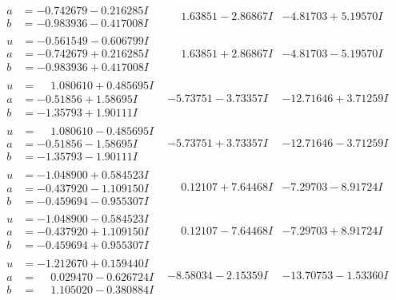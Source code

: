 \documentclass[1p]{elsarticle_modified}
\theoremstyle{definition}
\begin{document}
$$\begin{array}{c|c|c}
\begin{aligned}
a &= -0.742679 - 0.216285 I \\
b &= -0.983936 - 0.417008 I\end{aligned}
 & \phantom{-}1.63851 - 2.86867 I & -4.81703 + 5.19570 I \\ \hline\begin{aligned}
u &= -0.561549 - 0.606799 I \\
a &= -0.742679 + 0.216285 I \\
b &= -0.983936 + 0.417008 I\end{aligned}
 & \phantom{-}1.63851 + 2.86867 I & -4.81703 - 5.19570 I \\ \hline\begin{aligned}
u &= \phantom{-}1.080610 + 0.485695 I \\
a &= -0.51856 + 1.58695 I \\
b &= -1.35793 + 1.90111 I\end{aligned}
 & -5.73751 - 3.73357 I & -12.71646 + 3.71259 I \\ \hline\begin{aligned}
u &= \phantom{-}1.080610 - 0.485695 I \\
a &= -0.51856 - 1.58695 I \\
b &= -1.35793 - 1.90111 I\end{aligned}
 & -5.73751 + 3.73357 I & -12.71646 - 3.71259 I \\ \hline\begin{aligned}
u &= -1.048900 + 0.584523 I \\
a &= -0.437920 - 1.109150 I \\
b &= -0.459694 - 0.955307 I\end{aligned}
 & \phantom{-}0.12107 + 7.64468 I & -7.29703 - 8.91724 I \\ \hline\begin{aligned}
u &= -1.048900 - 0.584523 I \\
a &= -0.437920 + 1.109150 I \\
b &= -0.459694 + 0.955307 I\end{aligned}
 & \phantom{-}0.12107 - 7.64468 I & -7.29703 + 8.91724 I \\ \hline\begin{aligned}
u &= -1.212670 + 0.159440 I \\
a &= \phantom{-}0.029470 - 0.626724 I \\
b &= \phantom{-}1.105020 - 0.380884 I\end{aligned}
 & -8.58034 - 2.15359 I & -13.70753 - 1.53360 I \\ \hline\begin{aligned}

\end{aligned}
\end{array}$$
\end{document}
